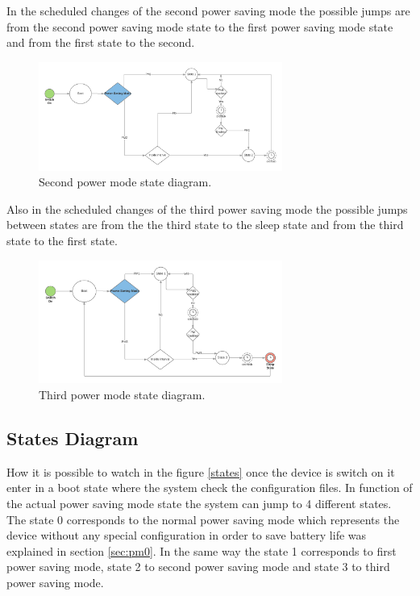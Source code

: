 			In the scheduled changes of the second power saving mode the possible jumps are from the second power saving mode state to the first power saving mode state and from the first state to the second.
			
			\begin{figure}[h!]
			\includegraphics[width=8cm]{fig/states-pm2.png}
			\centering
			\caption{Second power mode state diagram. \label{fig:pm2}}
			
			\end{figure}

			Also in the scheduled changes of the third power saving mode the possible jumps between states are from the the third state to the sleep state and from the third state to the first state.
			
			\begin{figure}[h!]
			\includegraphics[width=8cm]{fig/states-pm3.png}
			\centering
			\caption{Third power mode state diagram. \label{fig:pm3}}
			\end{figure}
			
		\subsection{States Diagram}

		How it is possible to watch in the figure \ref{states} once the device is switch on it enter in a boot state where the system check the configuration files. In function of the actual power saving mode state the system can jump to 4 different states. The state 0 corresponds to the normal power saving mode which represents the device without any special configuration in order to save battery life was explained in section \ref{sec:pm0}. In the same way the state 1 corresponds to first power saving mode, state 2 to second power saving mode and state 3 to third power saving mode.

